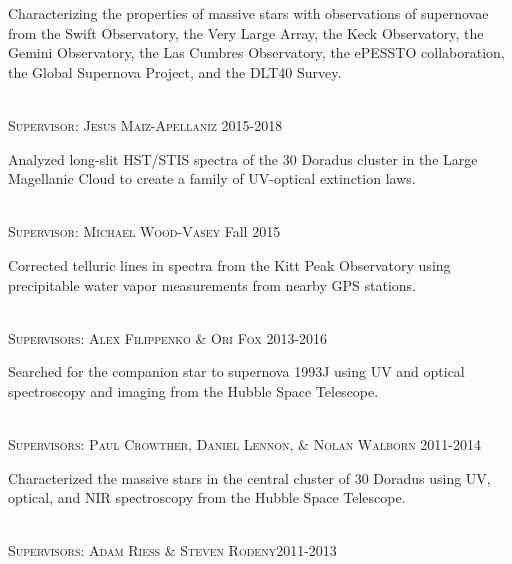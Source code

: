 \documentclass[10pt]{cv}
\begin{document}
\begin{llist}
\begin{minipage}[l]{0.7\textwidth}
Characterizing the properties of massive stars with observations of supernovae from the Swift Observatory, the Very Large Array, the Keck Observatory, the Gemini Observatory, the Las Cumbres Observatory, the ePESSTO collaboration, the Global Supernova Project, and the DLT40 Survey.\\
\end{minipage}
\\
\textsc{Supervisor: Jesus Maiz-Apellaniz} \hfill 2015-2018\\
\begin{minipage}[l]{0.7\textwidth}\vspace{0.15cm}
Analyzed long-slit HST/STIS spectra of the 30 Doradus cluster in 
the Large Magellanic Cloud to create a family of UV-optical extinction laws. \\
\end{minipage}
\\
\textsc{Supervisor: Michael Wood-Vasey} \hfill Fall 2015\\
\begin{minipage}[l]{0.7\textwidth}\vspace{0.15cm}
Corrected telluric lines in spectra from the Kitt Peak Observatory using
precipitable water vapor measurements from nearby GPS stations.\\
\end{minipage}
\\
\textsc{Supervisors: Alex Filippenko \& Ori Fox} \hfill 2013-2016\\
\begin{minipage}[l]{0.7\textwidth}\vspace{0.15cm}
Searched for the companion star to supernova 1993J using UV and optical 
spectroscopy and imaging from the Hubble Space Telescope.\\
\end{minipage}
\\
\textsc{Supervisors: Paul Crowther, Daniel Lennon, \& Nolan Walborn} \hfill 2011-2014\\
\begin{minipage}[l]{0.7\textwidth}\vspace{0.15cm}
Characterized the massive stars in the central cluster of 30 Doradus using 
UV, optical, and NIR spectroscopy from the Hubble Space Telescope.\\
\end{minipage}
\\
\textsc{Supervisors: Adam Riess \& Steven Rodeny}\hfill 2011-2013\\

\end{llist}
\end{document}
